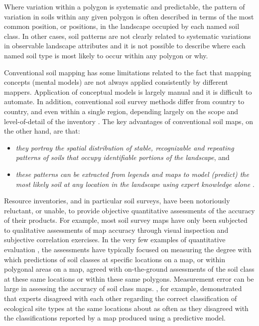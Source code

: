 \documentclass[graybox,natbib,nospthms,UStrade]{svmono}
\begin{document}
Where variation within a polygon is systematic and predictable, the
pattern of variation in soils within any given polygon is often
described in terms of the most common position, or positions, in the
landscape occupied by each named soil class. In other cases, soil
patterns are not clearly related to systematic variations in observable
landscape attributes and it is not possible to describe where each named
soil type is most likely to occur within any polygon or why.

Conventional soil mapping has some limitations related to the fact that
mapping concepts (mental models) are not always applied consistently by different mappers. Application of conceptual models is largely
manual and it is difficult to automate. In addition, conventional soil
survey methods differ from country to country, and even within a single
region, depending largely on the scope and level-of-detail of the
inventory \citep{Schelling1970Geoderma, SSS1983USDA, Rossiter2001}. The key
advantages of conventional soil maps, on the other hand, are that:

\begin{itemize}
\item
  \emph{they portray the spatial distribution of stable, recognizable and
  repeating patterns of soils that occupy identifiable portions of the landscape}, and
\item
  \emph{these patterns can be extracted from legends and maps to model (predict) the
  most likely soil at any location in the landscape using expert
  knowledge alone} \citep{Zhu2001}.
\end{itemize}

Resource inventories, and in particular soil surveys, have been
notoriously reluctant, or unable, to provide objective quantitative
assessments of the accuracy of their products. For example, most soil
survey maps have only been subjected to qualitative assessments of map
accuracy through visual inspection and subjective correlation exercises.
In the very few examples of quantitative evaluation
\citep{Marsman1986ALTERRA, Finke2006Elsevier}, the assessments have
typically focused on measuring the degree with which predictions of
soil classes at specific locations on a map, or within polygonal areas
on a map, agreed with on-the-ground assessments of the soil class at
these same locations or within these same polygons. Measurement error
can be large in assessing the accuracy of soil class maps.
\citet{MacMillan2005CJSS}, for example, demonstrated that experts disagreed
with each other regarding the correct classification of ecological site
types at the same locations about as often as they disagreed with the
classifications reported by a map produced using a predictive model.
\end{document}
